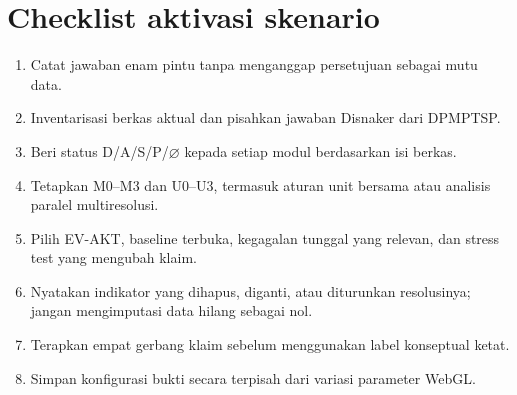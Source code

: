 \documentclass[10pt]{article}
\begin{document}
\section{Checklist aktivasi skenario}

\begin{enumerate}
  \item Catat jawaban enam pintu tanpa menganggap persetujuan sebagai mutu data.
  \item Inventarisasi berkas aktual dan pisahkan jawaban Disnaker dari DPMPTSP.
  \item Beri status D/A/S/P/$\varnothing$ kepada setiap modul berdasarkan isi berkas.
  \item Tetapkan M0--M3 dan U0--U3, termasuk aturan unit bersama atau analisis paralel multiresolusi.
  \item Pilih EV-AKT, baseline terbuka, kegagalan tunggal yang relevan, dan stress test yang mengubah klaim.
  \item Nyatakan indikator yang dihapus, diganti, atau diturunkan resolusinya; jangan mengimputasi data hilang sebagai nol.
  \item Terapkan empat gerbang klaim sebelum menggunakan label konseptual ketat.
  \item Simpan konfigurasi bukti secara terpisah dari variasi parameter WebGL.
\end{enumerate}
\end{document}
